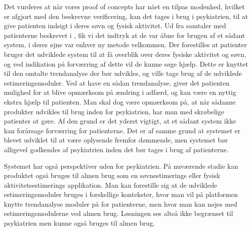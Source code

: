 Det vurderes at når vores proof of concepts har nået en tilpas modenhed, hvilket er afgjort med den beskrevne verificering, kan det tages i brug i psykiatrien, til at give patienten indsigt i deres søvn og fysisk aktivitet. 
Ud fra samtaler med patienterne beskrevet i \citet{misc:faellesrapp}, fik vi det indtryk at de var åbne for brugen af et sådant system, i deres øjne var enhver ny metode velkommen.
Der forestilles at patienter bruger det udviklede system til at få overblik over deres fysiske aktivitet og søvn, og ved indikation på forværring af dette vil de kunne søge hjælp. 
Dette er knyttet til den omtalte trendanalyse der bør udvikles, og ville tage brug af de udviklede estimeringsmoduler.
Ved at have en sådan trendanalyse, giver det patienten mulighed for at blive opmærksom på ændring i adfærd, og kan være en nyttig ekstra hjælp til patienten.
Man skal dog være opmærksom på, at når sådanne produkter udvikles til brug inden for psykiatrien, har man med skrøbelige patienter at gøre.
Af den grund er det yderst vigtigt, at et sådant system ikke kan forårsage forværring for patienterne.
Det er af samme grund at systemet er blevet udviklet til at være oplysende fremfor dømmende, men systemet bør alligevel godkendes af psykiatrien inden det bør tages i brug af patienterne.

Systemet har også perspektiver uden for psykiatrien.
På nuværende stadie kan produktet også bruges til almen brug som en søvnestimerings eller fysisk aktivitetsestimerings applikation.
Man kan forestille sig at de udviklede estimeringsmoduler bruges i forskellige kontekster, hvor man vil på platformen knytte trendanalyse moduler på for patienterne, men hvor man kan nøjes med estimeringsmodulerne ved almen brug.
Løsningen ses altså ikke begrænset til psykiatrien men kunne også bruges til almen brug.

